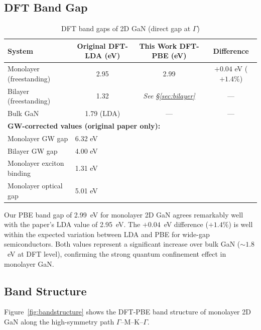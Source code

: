 \documentclass[11pt]{article}
\begin{document}
\subsection{DFT Band Gap}

\begin{table}[H]
\centering
\caption{DFT band gaps of 2D GaN (direct gap at $\Gamma$)}
\label{tab:bandgaps}
\begin{tabular}{@{}lccc@{}}
\toprule
\textbf{System} & \textbf{Original DFT-LDA (eV)} & \textbf{This Work DFT-PBE (eV)} & \textbf{Difference} \\
\midrule
Monolayer (freestanding) & 2.95 & 2.99 & $+0.04$ eV ($+1.4\%$) \\
Bilayer (freestanding) & 1.32 & \textit{See \S\ref{sec:bilayer}} & --- \\
Bulk GaN & 1.79 (LDA) & --- & --- \\
\midrule
\multicolumn{4}{l}{\textbf{GW-corrected values (original paper only):}} \\
Monolayer GW gap & \multicolumn{3}{l}{6.32 eV} \\
Bilayer GW gap & \multicolumn{3}{l}{4.00 eV} \\
Monolayer exciton binding & \multicolumn{3}{l}{1.31 eV} \\
Monolayer optical gap & \multicolumn{3}{l}{5.01 eV} \\
\bottomrule
\end{tabular}
\end{table}

Our PBE band gap of 2.99~eV for monolayer 2D GaN agrees remarkably well with the paper's LDA value of 2.95~eV. The $+0.04$~eV difference ($+1.4\%$) is well within the expected variation between LDA and PBE for wide-gap semiconductors. Both values represent a significant increase over bulk GaN ($\sim 1.8$~eV at DFT level), confirming the strong quantum confinement effect in monolayer GaN.

\subsection{Band Structure}

Figure~\ref{fig:bandstructure} shows the DFT-PBE band structure of monolayer 2D GaN along the high-symmetry path $\Gamma$--M--K--$\Gamma$.
\end{document}
